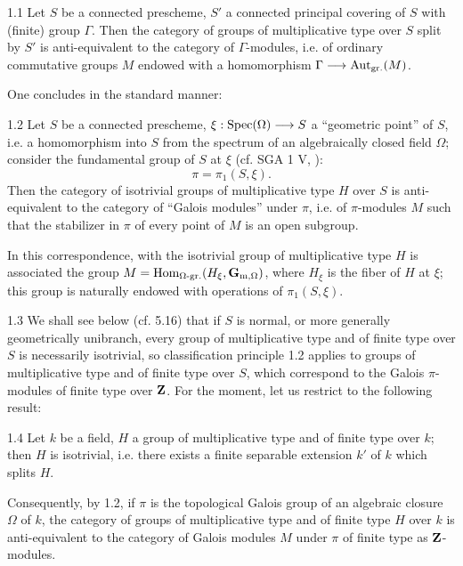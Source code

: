 \begin{proposition}{1.1}\label{X.1.1}
Let $S$ be a connected prescheme, $S'$ a connected principal covering of $S$ with (finite) group $\Gamma$. Then the category of groups of multiplicative type over $S$ split by $S'$ is anti-equivalent to the category of $\Gamma$-modules, i.e. of ordinary commutative groups $M$ endowed with a homomorphism $\Gamma\longrightarrow\operatorname{Aut}_{\mathrm{gr.}}(M)$.
\end{proposition}
One concludes in the standard manner:
\begin{corollary}{1.2}\label{X.1.2}
Let $S$ be a connected prescheme, $\xi:\operatorname{Spec}(\Omega)\longrightarrow S$ a ``geometric point'' of $S$, i.e. a homomorphism into $S$ from the spectrum of an algebraically closed field $\Omega$; consider the fundamental group of $S$ at $\xi$ (cf. SGA 1 V, ):
\[
\pi=\pi_1(S,\xi).
\]
Then the category of isotrivial groups of multiplicative type $H$ over $S$ is anti-equivalent to the category of ``Galois modules'' under $\pi$, i.e. of $\pi$-modules $M$ such that the stabilizer in $\pi$ of every point of $M$ is an open subgroup.
\end{corollary}
In this correspondence, with the isotrivial group of multiplicative type $H$ is associated the group $M=\operatorname{Hom}_{\Omega\text{-}\mathrm{gr.}}(H_\xi,\mathbf{G}_{\mathrm{m},\Omega})$, where $H_\xi$ is the fiber of $H$ at $\xi$; this group is naturally endowed with operations of $\pi_1(S,\xi)$.
\begin{remark}{1.3}\label{X.1.3}
We shall see below (cf. 5.16) that if $S$ is normal, or more generally geometrically unibranch, every group of multiplicative type and of finite type over $S$ is necessarily isotrivial, so classification principle 1.2 applies to groups of multiplicative type and of finite type over $S$, which correspond to the Galois $\pi$-modules of finite type over $\mathbf{Z}$. For the moment, let us restrict to the following result:
\end{remark}
\begin{proposition}{1.4}\label{X.1.4}
Let $k$ be a field, $H$ a group of multiplicative type and of finite type over $k$; then $H$ is isotrivial, i.e. there exists a finite separable extension $k'$ of $k$ which splits $H$.
\end{proposition}
Consequently, by 1.2, if $\pi$ is the topological Galois group of an algebraic closure $\Omega$ of $k$, the category of groups of multiplicative type and of finite type $H$ over $k$ is anti-equivalent to the category of Galois modules $M$ under $\pi$ of finite type as $\mathbf{Z}$-modules.

